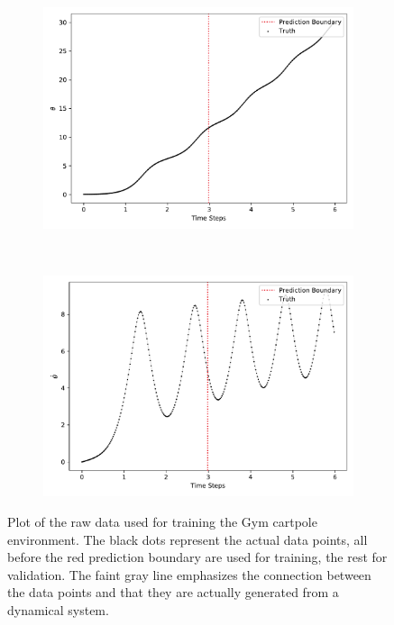 \begin{figure}
\begin{subfigure}{0.5\linewidth}
					\includegraphics[width=\linewidth]{figures/experiments/environments/observations-cartpole-gym-N0-D2.pdf}
				\end{subfigure}%
				~
				\begin{subfigure}{0.5\linewidth}
					\centering
					\includegraphics[width=\linewidth]{figures/experiments/environments/observations-cartpole-gym-N0-D3.pdf}
				\end{subfigure}
				\caption{Plot of the raw data used for training the Gym cartpole environment. The black dots represent the actual data points, all before the red prediction boundary are used for training, the rest for validation. The faint gray line emphasizes the connection between the data points and that they are actually generated from a dynamical system.}
				\label{fig:envCartpoleGym}
			\end{figure}


